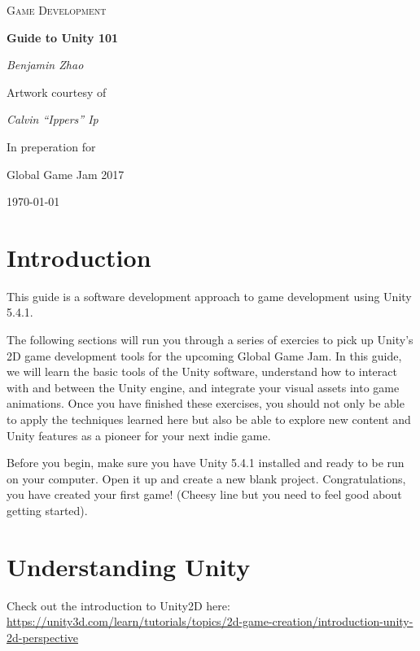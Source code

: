 \documentclass[12pt]{article}
\begin{document}
\begin{titlepage}
	\centering
	\vspace{4cm}
	{\scshape\Large Game Development\par}
	\vspace{6.5cm}
	{\huge\bfseries Guide to Unity 101\par}
	\vspace{2cm}
	{\Large\itshape Benjamin Zhao\par}
	\vfill
	Artwork courtesy of\par
	{\itshape Calvin ``Ippers'' Ip\par}
  \vfill
	In preperation for\par
	Global Game Jam 2017\par
	\vspace{2cm}
	
	{\large \today\par}
\end{titlepage}

\newpage
\section{Introduction}

This guide is a software development approach to game development using Unity 5.4.1. 

The following sections will run you through a series of exercies to pick up Unity's 2D game development tools for the upcoming Global Game Jam. In this guide, we will learn the basic tools of the Unity software, understand how to interact with and between the Unity engine, and integrate your visual assets into game animations. Once you have finished these exercises, you should not only be able to apply the techniques learned here but also be able to explore new content and Unity features as a pioneer for your next indie game. 

Before you begin, make sure you have Unity 5.4.1 installed and ready to be run on your computer. Open it up and create a new blank project. Congratulations, you have created your first game! (Cheesy line but you need to feel good about getting started). 

\section{Understanding Unity}

Check out the introduction to Unity2D here: \url{https://unity3d.com/learn/tutorials/topics/2d-game-creation/introduction-unity-2d-perspective}
\end{document}
